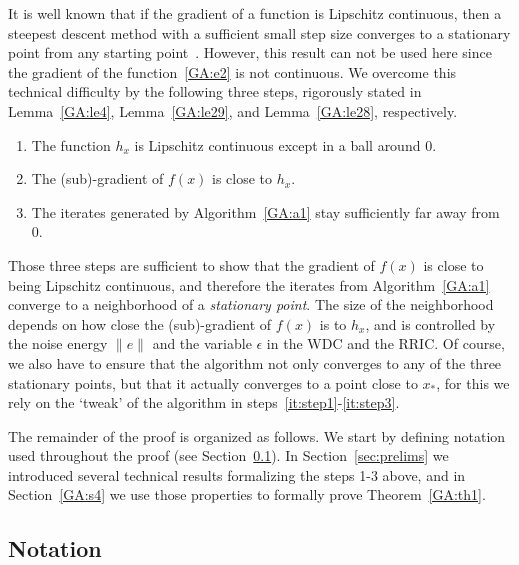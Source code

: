 It is well known that if the gradient of a function is Lipschitz continuous, then a steepest descent method with a sufficient small step size converges to a stationary point from any starting point~\cite{NocWri2006}. However, this result can not be used here since the gradient of the function~\eqref{GA:e2} is not continuous. We overcome this technical difficulty by the following three steps, rigorously stated in Lemma~\ref{GA:le4}, Lemma~\ref{GA:le29}, and Lemma~\ref{GA:le28}, respectively.
\begin{enumerate}
\item\label{it:step1} The function $h_{x}$ is Lipschitz continuous except in a ball around 0.
\item The (sub)-gradient of $f(x)$ is close to $h_x$.
\item\label{it:step3} The iterates generated by Algorithm~\ref{GA:a1} stay sufficiently far away from 0.
\end{enumerate}
Those three steps are sufficient to show that the gradient of $f(x)$ is close to being Lipschitz continuous, and therefore the iterates from Algorithm~\ref{GA:a1} converge to a neighborhood of a \emph{stationary point}.
The size of the neighborhood depends on how close the (sub)-gradient of $f(x)$ is to $h_x$, and is controlled by the noise energy $\|e\|$ and the variable $\epsilon$ in the WDC and the RRIC.
Of course, we also have to ensure that the algorithm not only converges to any of the three stationary points, but that it actually converges to a  point close to $x_*$, for this we rely on the `tweak'  of the algorithm in steps~\ref{it:step1}-\ref{it:step3}.

The remainder of the proof is organized as follows.
We start by defining notation used throughout the proof (see Section~\ref{GA:s5}).
In Section~\ref{sec:prelims} we introduced several technical results formalizing the steps 1-3 above, and in Section~\ref{GA:s4} we use those properties to formally prove  Theorem~\ref{GA:th1}.

\subsection{Notation} \label{GA:s5}

